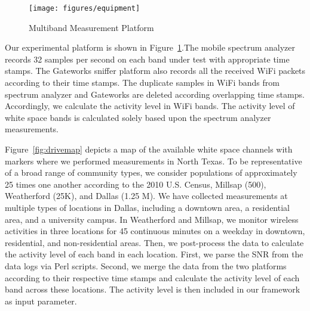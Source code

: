   \begin{figure}
  \centering
  \texttt{[image: figures/equipment]}
  \vspace{-0.1in}
  \caption{Multiband Measurement Platform}
  \label{fig:equipment}
  \vspace{-0.2in}
  \end{figure}
  
Our experimental platform is shown in Figure~\ref{fig:equipment}.The mobile spectrum analyzer records 32 samples 
per second on each band under test with appropriate time stamps. The Gateworks sniffer platform also records all 
the received WiFi packets according to their time stamps. The duplicate samples in WiFi bands from spectrum analyzer 
and Gateworks are deleted according overlapping time stamps. Accordingly, we calculate the activity level in WiFi 
bands. The activity level of white space bands is calculated solely based upon the spectrum analyzer measurements.

Figure~\ref{fig:drivemap} depicts a map of the available white space channels with markers where we performed 
measurements in North Texas. To be representative of a broad range of community types, we consider populations of 
approximately 25 times one another according to the 2010 U.S. Census, Millsap (500), Weatherford (25K), and Dallas 
(1.25 M). We have collected measurements at multiple types of locations in Dallas, including a downtown area,
a residential area, and a university campus. In Weatherford and Millsap, we monitor wireless activities in three 
locations for 45 continuous minutes on a weekday in downtown, residential, and non-residential areas. Then, we 
post-process the data to calculate the activity level of each band in each location. First, we parse the SNR from 
the data logs via Perl scripts. Second, we merge the data from the two platforms according to their respective 
time stamps and calculate the activity level of each band across these locations. The activity level is then 
included in our framework as input parameter. 

